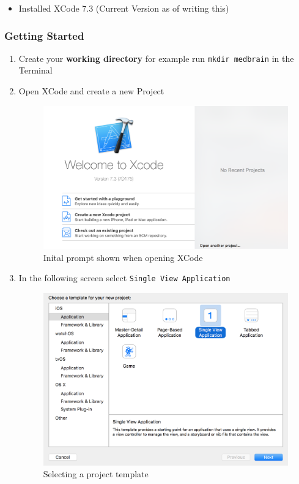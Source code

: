 \documentclass{article}
\begin{document}
\begin{itemize}

\item
  Installed XCode 7.3 (Current Version as of writing this)
\end{itemize}

\subsubsection{Getting Started}\label{step1:getting-started}

\begin{enumerate}
\def\labelenumi{\arabic{enumi}.}
\item
  Create your \textbf{working directory} for example run
  \texttt{mkdir\ medbrain} in the Terminal
\item
  Open XCode and create a new Project

\begin{figure}[H]
\centering
\includegraphics[width=\linewidth]{resources/step1/step_1_1.png}
\caption{Inital prompt shown when opening XCode}
\label{fig:create_project_screen}
\end{figure}

\item
  In the following screen select \texttt{Single\ View\ Application}

  \begin{figure}[H]
  \centering
  \includegraphics[width=\linewidth]{resources/step1/step_1_2.png}
  \caption{Selecting a project template}
  \label{fig:selecting_project_template}
  \end{figure}


\end{enumerate}
\end{document}

